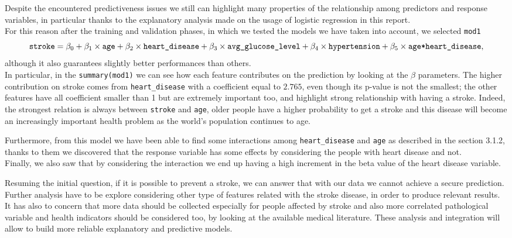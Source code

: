 \documentclass[
]{article}
\begin{document}
Despite the encountered predictiveness issues we still can highlight
many properties of the relationship among predictors and response
variables, in particular thanks to the explanatory analysis made on the
usage of logistic regression in this report.\\
For this reason after the training and validation phases, in which we
tested the models we have taken into account, we selected \texttt{mod1}
\[\verb|stroke| = \beta_0 + \beta_1\times \verb|age| + \beta_2\times \verb|heart_disease| + \beta_3 \times  \verb|avg_glucose_level| + \beta_4 \times\verb|hypertension| + \beta_5 \times \verb|age*heart_disease|,\]
although it also guarantees slightly better performances than others.\\
In particular, in the \texttt{summary(mod1)} we can see how each feature
contributes on the prediction by looking at the \(\beta\) parameters.
The higher contribution on stroke comes from \texttt{heart\_disease}
with a coefficient equal to \(2.765\), even though its p-value is not
the smallest; the other features have all coefficient smaller than 1 but
are extremely important too, and highlight strong relationship with
having a stroke. Indeed, the strongest relation is always between
\texttt{stroke} and \texttt{age}, older people have a higher probability
to get a stroke and this disease will become an increasingly important
health problem as the world's population continues to age.

Furthermore, from this model we have been able to find some interactions
among \texttt{heart\_disease} and \texttt{age} as described in the
section 3.1.2, thanks to them we discovered that the response variable has
some effects by considering the people with heart disease and not.\\
Finally, we also saw that by considering the interaction we end up
having a high increment in the beta value of the heart disease variable.

Resuming the initial question, if it is possible to prevent a stroke, we
can answer that with our data we cannot achieve a secure prediction. Further analysis have to be explore considering other type of features
related with the stroke disease, in order to produce relevant results.\\
It has also to concern that more data should be collected especially for
people affected by stroke and also more correlated pathological variable
and health indicators should be considered too, by looking at the
available medical literature. These analysis and integration will allow
to build more reliable explanatory and predictive models.
\end{document}
